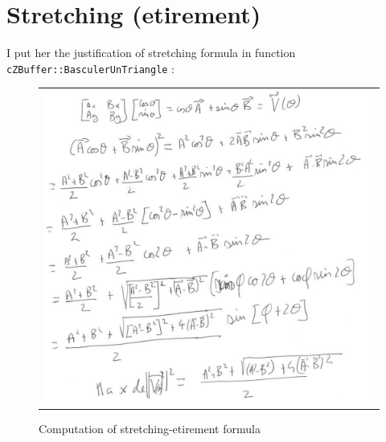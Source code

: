 \section{Stretching (etirement)}

I put her the justification of stretching formula in function {\tt cZBuffer::BasculerUnTriangle} :

\begin{figure}
\begin{tabular}{|c|}
   \hline \hline
   \includegraphics[width=160mm]{FIGS/Formules/CalcEtir.JPG}
\end{tabular}
\label{Not:CalcEtir}
\caption{Computation of stretching-etirement formula}
\end{figure}


